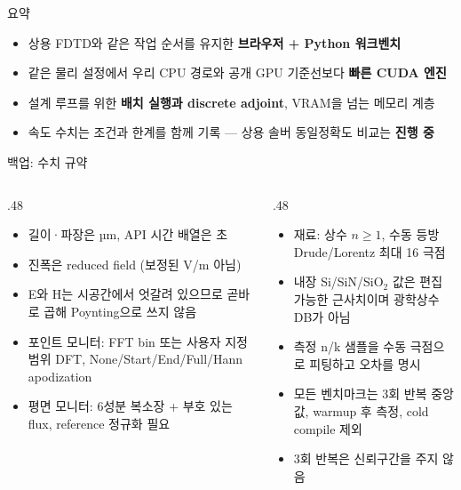 \documentclass[aspectratio=169,11pt]{beamer}
\begin{document}
\begin{frame}[standout]
  요약\\[4mm]
  {\normalsize
  \begin{minipage}{.8\textwidth}
    \begin{itemize}
      \item 상용 FDTD와 같은 작업 순서를 유지한 \textbf{브라우저 + Python 워크벤치}
      \item 같은 물리 설정에서 우리 CPU 경로와 공개 GPU 기준선보다 \textbf{빠른 CUDA 엔진}
      \item 설계 루프를 위한 \textbf{배치 실행과 discrete adjoint}, VRAM을 넘는 메모리 계층
      \item 속도 수치는 조건과 한계를 함께 기록 — 상용 솔버 동일정확도 비교는 \textbf{진행 중}
    \end{itemize}
  \end{minipage}}
\end{frame}

\appendix

\begin{frame}{백업: 수치 규약}
  \begin{columns}[T]
    \begin{column}{.48\textwidth}
      \begin{itemize}\footnotesize
        \item 길이·파장은 µm, API 시간 배열은 초
        \item 진폭은 reduced field (보정된 V/m 아님)
        \item E와 H는 시공간에서 엇갈려 있으므로 곧바로 곱해 Poynting으로 쓰지 않음
        \item 포인트 모니터: FFT bin 또는 사용자 지정 범위 DFT, None/Start/End/Full/Hann apodization
        \item 평면 모니터: 6성분 복소장 + 부호 있는 flux, reference 정규화 필요
      \end{itemize}
    \end{column}
    \begin{column}{.48\textwidth}
      \begin{itemize}\footnotesize
        \item 재료: 상수 $n \geq 1$, 수동 등방 Drude/Lorentz 최대 16 극점
        \item 내장 Si/SiN/SiO$_2$ 값은 편집 가능한 근사치이며 광학상수 DB가 아님
        \item 측정 n/k 샘플을 수동 극점으로 피팅하고 오차를 명시
        \item 모든 벤치마크는 3회 반복 중앙값, warmup 후 측정, cold compile 제외
        \item 3회 반복은 신뢰구간을 주지 않음
      \end{itemize}
    \end{column}
  \end{columns}
\end{frame}
\end{document}
